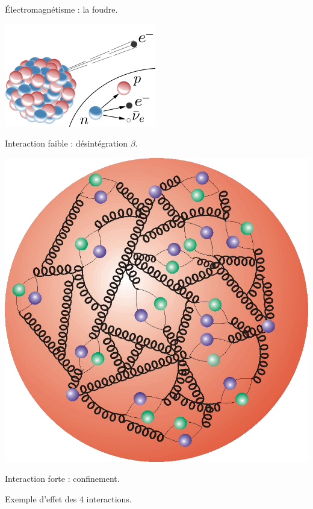 {	\captionsetup{type=subfigure}\caption{Électromagnétisme : la foudre.}
	\includegraphics[width=\marginparwidth]{SM/beta.png}
	\captionsetup{type=subfigure}\caption{Interaction faible : désintégration $\beta$.}
	\includegraphics[width=0.8\marginparwidth]{SM/quarks3.png}
	\captionsetup{type=subfigure}\caption{Interaction forte : confinement.}
	\captionsetup{type=figure}\caption{Exemple d'effet des \num{4} interactions.}
}

